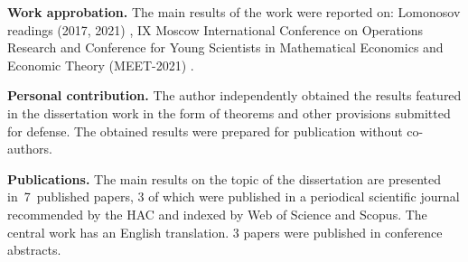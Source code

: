 
\textbf{Work approbation.}
The main results of the work were reported on: Lomonosov readings (2017, 2021) \cite{ownlmr2017, ownlmr2021}, IX Moscow International Conference on Operations Research \cite{ownorm2018} and Conference for Young Scientists in Mathematical Economics and Economic Theory (MEET-2021) \cite{meet2021}. %

\textbf{Personal contribution.} The author independently obtained the results featured in the dissertation work in the form of theorems and other provisions submitted for defense. The obtained results were prepared for publication without co-authors. %

\textbf{Publications.} The main results on the topic of the dissertation are presented in~7~published papers, 3 of which \cite{ownconsp}\cite{owncards}\cite{ownsched} were published in a periodical scientific journal recommended by the HAC and indexed by Web of Science and Scopus. The central work has an English translation\cite{ownconsp_eng}. 3 papers were published in conference abstracts. %
